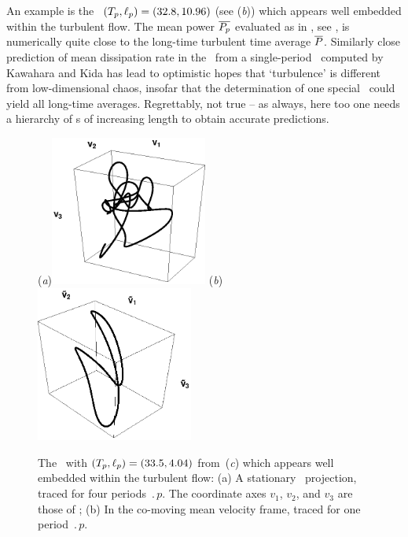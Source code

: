 An example is
the \rpo\ $({T_{p}},\ell_p) = (32.8,10.96)$
(see (\textit{b})) which appears well embedded
within the turbulent flow. The mean power $\overline{P_p}$ evaluated
as in , see ,
is numerically quite close to the long-time
turbulent time average $\overline{P}$.
Similarly close prediction of mean dissipation rate in the
\pCf\ from a single-period \po\ computed by
Kawahara and Kida has lead to
optimistic hopes that `turbulence' is different from
low-dimensional chaos, insofar that the determination of one special
\po\ could yield all long-time averages.
Regrettably, not true -- as always, here too one needs a hierarchy
of \po s of increasing length to obtain accurate
predictions.

\begin{figure}[t]
\begin{center}
(\textit{a})\includegraphics[width=0.46\textwidth, clip=true]{figs/ks22rpo033.50_04.045E2.eps}
(\textit{b})\includegraphics[width=0.46\textwidth, clip=true]{figs/ks22rpo033.50_04.045E2CM.eps}
\\
\end{center}
\caption{
 The
\rpo\ with $({T_{p}},\ell_p) =(33.5,4.04)$
from \,(\textit{c})
which appears well embedded within the turbulent flow:
 (a) A stationary \statesp\ projection,
  traced for four periods $\period{p}$. The coordinate axes
$v_1$, $v_2$, and $v_3$ are those of ;
 (b) In the co-moving mean velocity frame,
 traced for one period $\period{p}$.
        } \label{f:MeanVelocityFrame}
\end{figure}


